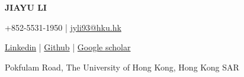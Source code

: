 \documentclass[a4paper,11pt]{article}
\newcommand{\socialicon}[1]{\raisebox{-0.05em}{\resizebox{!}{1em}{#1}}}
\newcommand{\ieeeicon}[1]{\raisebox{-0.3em}{\resizebox{!}{1.3em}{#1}}}
\newcommand{\headerfontiii}{\fontfamily{ppl}\selectfont} %
\begin{document}
\headerfontiii

\begin{center}
    {\Huge\textbf{JIAYU LI}}
\end{center}
\vspace{-6mm}

\begin{center}
    \small{
    +852-5531-1950 | \href{mailto:jyli93@hku.hk}{jyli93@hku.hk}
    }
\end{center}
\vspace{-6mm}

\begin{center}
    \small{
    \socialicon{\faLinkedin} \href{https://www.linkedin.com/in/jiayu-li-945537320/}{Linkedin} | 
    \socialicon{\faGithub} \href{https://github.com/jylicmp}{Github} | 
    \socialicon{\faGoogle} \href{https://scholar.google.com/citations?user=XHvrW1sAAAAJ&hl=en}{Google scholar}
    }
\end{center}
\vspace{-6mm}
\begin{center}
    \small{Pokfulam Road, The University of Hong Kong, Hong Kong SAR}
\end{center}

\vspace{-2mm}

\end{document}
